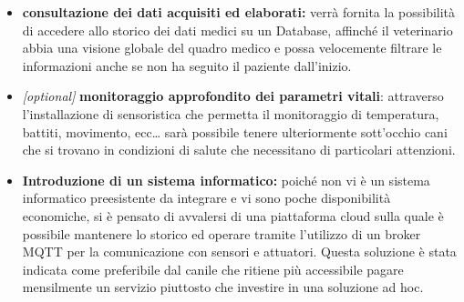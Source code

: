 \begin{itemize}
\item \textbf{consultazione dei dati acquisiti ed elaborati:} verrà fornita la possibilità di accedere allo storico dei dati medici su un Database, affinché il veterinario abbia una visione globale del quadro medico e possa velocemente filtrare le informazioni anche se non ha seguito il paziente dall'inizio. 
\item \emph{{[}optional{]}} 
\textbf{monitoraggio approfondito dei parametri
vitali}: attraverso l'installazione di sensoristica che permetta il monitoraggio di temperatura, battiti, movimento, ecc\ldots{} sarà possibile tenere ulteriormente sott'occhio cani che si trovano in condizioni di salute che necessitano di particolari attenzioni.

\item \textbf{Introduzione di un sistema informatico: } poiché non vi è un sistema informatico preesistente da integrare e vi sono poche disponibilità economiche, si è pensato di avvalersi di una piattaforma cloud sulla quale è possibile mantenere lo storico ed operare tramite l'utilizzo di un broker MQTT per la comunicazione  con sensori e attuatori. Questa soluzione è stata indicata come preferibile dal canile che ritiene più accessibile pagare mensilmente un servizio piuttosto che investire in una soluzione ad hoc. 

\end{itemize}





